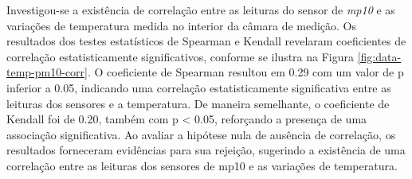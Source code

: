 Investigou-se a existência de correlação entre as leituras do sensor de \textit{mp10} e as variações de temperatura medida no interior da câmara de medição. Os resultados dos testes estatísticos de Spearman e Kendall revelaram coeficientes de correlação estatisticamente significativos, conforme se ilustra na Figura \ref{fig:data-temp-pm10-corr}. O coeficiente de Spearman resultou em 0.29 com um valor de p inferior a 0.05, indicando uma correlação estatisticamente significativa entre as leituras dos sensores e a temperatura. De maneira semelhante, o coeficiente de Kendall foi de 0.20, também com p < 0.05, reforçando a presença de uma associação significativa. Ao avaliar a hipótese nula de ausência de correlação, os resultados forneceram evidências para sua rejeição, sugerindo a existência de uma correlação entre as leituras dos sensores de \acrshort{mp10} e as variações de temperatura.